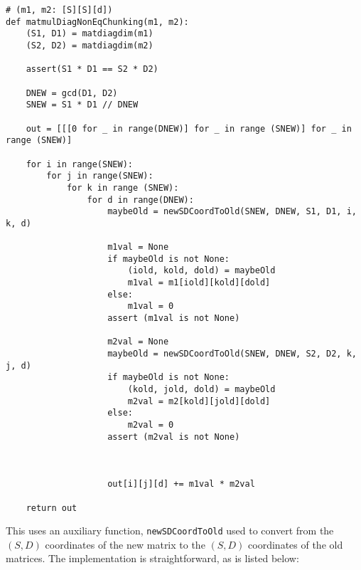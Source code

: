 \documentclass[11pt]{article}
\begin{document}
\begin{verbatim}
# (m1, m2: [S][S][d])
def matmulDiagNonEqChunking(m1, m2):
    (S1, D1) = matdiagdim(m1)
    (S2, D2) = matdiagdim(m2)

    assert(S1 * D1 == S2 * D2)

    DNEW = gcd(D1, D2)
    SNEW = S1 * D1 // DNEW

    out = [[[0 for _ in range(DNEW)] for _ in range (SNEW)] for _ in range (SNEW)]

    for i in range(SNEW):
        for j in range(SNEW):
            for k in range (SNEW):
                for d in range(DNEW):
                    maybeOld = newSDCoordToOld(SNEW, DNEW, S1, D1, i, k, d)

                    m1val = None
                    if maybeOld is not None:
                        (iold, kold, dold) = maybeOld
                        m1val = m1[iold][kold][dold]
                    else:
                        m1val = 0
                    assert (m1val is not None)

                    m2val = None
                    maybeOld = newSDCoordToOld(SNEW, DNEW, S2, D2, k, j, d)
                    if maybeOld is not None:
                        (kold, jold, dold) = maybeOld
                        m2val = m2[kold][jold][dold]
                    else:
                        m2val = 0
                    assert (m2val is not None)



                    out[i][j][d] += m1val * m2val

    return out
\end{verbatim}

\newpage
This uses an auxiliary function, \texttt{newSDCoordToOld} used to convert
from the $(S, D)$ coordinates of the new matrix to the $(S, D)$ coordinates
of the old matrices. The implementation is straightforward, as is listed
below:
\end{document}
